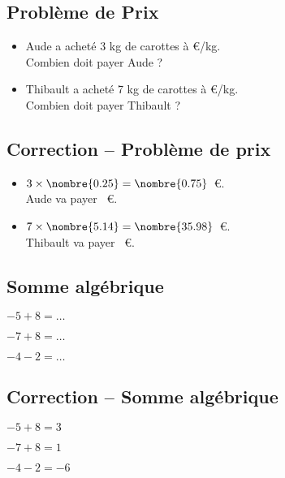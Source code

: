 \documentclass[a4paper,11pt,fleqn]{article}
\begin{document}
\pagestyle{empty}


\subsection*{Problème de Prix}
\begin{itemize}
\item Aude a acheté 3 kg de carottes à  €/kg.\\
Combien doit payer Aude ?

\item Thibault a acheté 7 kg de carottes à  €/kg.\\
Combien doit payer Thibault ?

\end{itemize}


\subsection*{Correction -- Problème de prix}
\begin{itemize}
	\item $3\times\nombre{0.25}=\nombre{0.75}$~€.\\
Aude va payer ~€.

	\item $7\times\nombre{5.14}=\nombre{35.98}$~€.\\
Thibault va payer ~€.

\end{itemize}

\subsection*{Somme algébrique}
\begin{description}

  \item $-5+8=\ldots$
  \item $-7+8=\ldots$
  \item $-4-2=\ldots$	
\end{description}

\subsection*{Correction -- Somme algébrique}
\begin{description}

  \item $-5+8=3$
  \item $-7+8=1$
  \item $-4-2=-6$	
\end{description}
\end{document}
